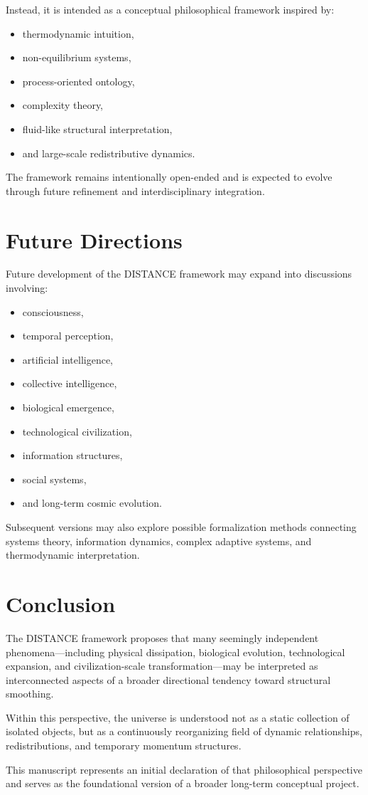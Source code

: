 \documentclass[11pt]{article}
\begin{document}
Instead, it is intended as a conceptual philosophical framework inspired by:

\begin{itemize}
    \item thermodynamic intuition,
    \item non-equilibrium systems,
    \item process-oriented ontology,
    \item complexity theory,
    \item fluid-like structural interpretation,
    \item and large-scale redistributive dynamics.
\end{itemize}

The framework remains intentionally open-ended and is expected to evolve through future refinement and interdisciplinary integration.

\section{Future Directions}

Future development of the DISTANCE framework may expand into discussions involving:

\begin{itemize}
    \item consciousness,
    \item temporal perception,
    \item artificial intelligence,
    \item collective intelligence,
    \item biological emergence,
    \item technological civilization,
    \item information structures,
    \item social systems,
    \item and long-term cosmic evolution.
\end{itemize}

Subsequent versions may also explore possible formalization methods connecting systems theory, information dynamics, complex adaptive systems, and thermodynamic interpretation.

\section{Conclusion}

The DISTANCE framework proposes that many seemingly independent phenomena---including physical dissipation, biological evolution, technological expansion, and civilization-scale transformation---may be interpreted as interconnected aspects of a broader directional tendency toward structural smoothing.

Within this perspective, the universe is understood not as a static collection of isolated objects, but as a continuously reorganizing field of dynamic relationships, redistributions, and temporary momentum structures.

This manuscript represents an initial declaration of that philosophical perspective and serves as the foundational version of a broader long-term conceptual project.
\end{document}
